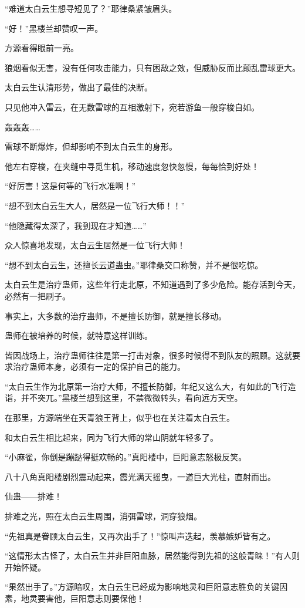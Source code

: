 \begin{this_body}
“难道太白云生想寻短见了？”耶律桑紧皱眉头。

“好！”黑楼兰却赞叹一声。

方源看得眼前一亮。

狼烟看似无害，没有任何攻击能力，只有困敌之效，但威胁反而比颠乱雷球更大。

太白云生认清形势，做出了最佳的决断。

只见他冲入雷云，在无数雷球的互相激射下，宛若游鱼一般穿梭自如。

轰轰轰……

雷球不断爆炸，但却影响不到太白云生的身形。

他左右穿梭，在夹缝中寻觅生机，移动速度忽快忽慢，每每恰到好处！

“好厉害！这是何等的飞行水准啊！”

“想不到太白云生大人，居然是一位飞行大师！！”

“他隐藏得太深了，我到现在才知道……”

众人惊喜地发现，太白云生居然是一位飞行大师！

“想不到太白云生，还擅长云道蛊虫。”耶律桑交口称赞，并不是很吃惊。

太白云生是治疗蛊师，这些年行走北原，不知道遇到了多少危险。能存活到今天，必然有一把刷子。

事实上，大多数的治疗蛊师，不是擅长防御，就是擅长移动。

蛊师在被培养的时候，就特意这样训练。

皆因战场上，治疗蛊师往往是第一打击对象，很多时候得不到队友的照顾。这就要求治疗蛊师本身，必须有一定的保护自己的能力。

“太白云生作为北原第一治疗大师，不擅长防御，年纪又这么大，有如此的飞行造诣，并不突兀。”黑楼兰想到这里，不禁微微转头，看向远方天空。

在那里，方源端坐在天青狼王背上，似乎也在关注着太白云生。

和太白云生相比起来，同为飞行大师的常山阴就年轻多了。

“小麻雀，你倒是蹦跶得挺欢畅的。”真阳楼中，巨阳意志怒极反笑。

八十八角真阳楼剧烈震动起来，霞光满天摇曳，一道巨大光柱，直射而出。

仙蛊——排难！

排难之光，照在太白云生周围，消弭雷球，洞穿狼烟。

“先祖真是眷顾太白云生，又再次出手了！”惊叫声迭起，羡慕嫉妒皆有之。

“这情形太古怪了，太白云生并非巨阳血脉，居然能得到先祖的这般青睐！”有人则开始怀疑。

“果然出手了。”方源暗叹，太白云生已经成为影响地灵和巨阳意志胜负的关键因素，地灵要害他，巨阳意志则要保他！

\end{this_body}

